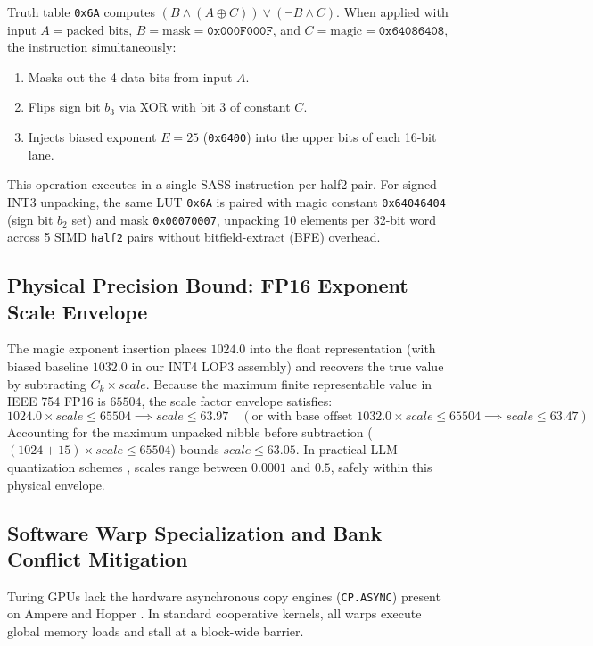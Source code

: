\documentclass[10pt,twocolumn,letterpaper]{article}
\begin{document}
Truth table \texttt{0x6A} computes $(B \land (A \oplus C)) \lor (\neg B \land C)$. When applied with input $A = \text{packed bits}$, $B = \text{mask} = \texttt{0x000F000F}$, and $C = \text{magic} = \texttt{0x64086408}$, the instruction simultaneously:
\begin{enumerate}
  \item Masks out the 4 data bits from input $A$.
  \item Flips sign bit $b_3$ via XOR with bit 3 of constant $C$.
  \item Injects biased exponent $E=25$ (\texttt{0x6400}) into the upper bits of each 16-bit lane.
\end{enumerate}
This operation executes in a single SASS instruction per half2 pair. For signed INT3 unpacking, the same LUT \texttt{0x6A} is paired with magic constant \texttt{0x64046404} (sign bit $b_2$ set) and mask \texttt{0x00070007}, unpacking 10 elements per 32-bit word across 5 SIMD \texttt{half2} pairs without bitfield-extract (BFE) overhead.

\subsection{Physical Precision Bound: FP16 Exponent Scale Envelope}
The magic exponent insertion places $1024.0$ into the float representation (with biased baseline $1032.0$ in our INT4 LOP3 assembly) and recovers the true value by subtracting $C_k \times scale$. Because the maximum finite representable value in IEEE 754 FP16 is $65504$, the scale factor envelope satisfies:
\begin{equation}
1024.0 \times scale \le 65504 \implies scale \le 63.97 \quad (\text{or with base offset } 1032.0 \times scale \le 65504 \implies scale \le 63.47)
\end{equation}
Accounting for the maximum unpacked nibble before subtraction ($(1024 + 15) \times scale \le 65504$) bounds $scale \le 63.05$. In practical LLM quantization schemes \cite{lin2024awq, frantar2023marlin}, scales range between $0.0001$ and $0.5$, safely within this physical envelope.

\subsection{Software Warp Specialization and Bank Conflict Mitigation}
Turing GPUs lack the hardware asynchronous copy engines (\texttt{CP.ASYNC}) present on Ampere and Hopper \cite{dao2023flashattention2}. In standard cooperative kernels, all warps execute global memory loads and stall at a block-wide barrier.
\end{document}
